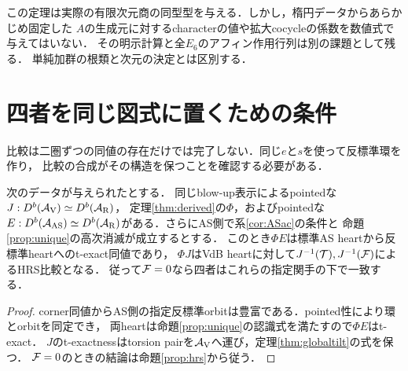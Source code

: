 \begin{remark}[同型型と生成元の係数]
この定理は実際の有限次元商の同型型を与える．しかし，楕円データからあらかじめ固定した
$A$の生成元に対するcharacterの値や拡大cocycleの係数を数値式で与えてはいない．
その明示計算と全$E_6$のアフィン作用行列は別の課題として残る．
単純加群の根類と次元の決定とは区別する．
\end{remark}



\section{四者を同じ図式に置くための条件}\label{sec:alignment}
比較は二圏ずつの同値の存在だけでは完了しない．同じ$e$と$s$を使って反標準環を作り，
比較の合成がその構造を保つことを確認する必要がある．
\begin{proposition}[pointedな比較の接続]\label{prop:alignment}
次のデータが与えられたとする．
同じblow-up表示によるpointedな$J:D^b(\mathcal A_{\mathrm V})\simeq D^b(\mathcal A_{\mathrm R})$，
定理\ref{thm:derived}の$\Phi$，およびpointedな
$E:D^b(\mathcal A_{\mathrm{AS}})\simeq D^b(\mathcal A_{\mathrm R})$がある．さらにAS側で系\ref{cor:ASac}の条件と
命題\ref{prop:unique}の高次消滅が成立するとする．
このとき$\Phi E$は標準AS heartから反標準heartへのt-exact同値であり，
$\Phi J$はVdB heartに対して$J^{-1}(\mathcal T),J^{-1}(\mathcal F)$によるHRS比較となる．
従って$\mathcal F=0$なら四者はこれらの指定関手の下で一致する．
\end{proposition}
\begin{proof}
corner同値からAS側の指定反標準orbitは豊富である．pointed性により環とorbitを同定でき，
両heartは命題\ref{prop:unique}の認識式を満たすので$\Phi E$はt-exact．
$J$のt-exactnessはtorsion pairを$\mathcal A_{\mathrm V}$へ運び，定理\ref{thm:globaltilt}の式を保つ．
$\mathcal F=0$のときの結論は命題\ref{prop:hrs}から従う．
\end{proof}

